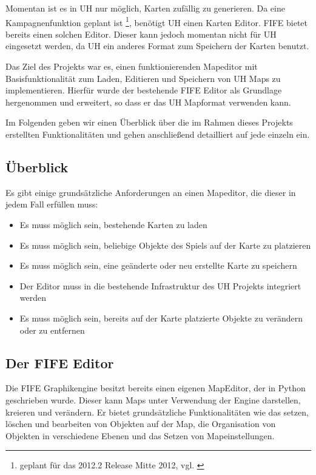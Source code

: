 Momentan ist es in UH nur möglich, Karten zufällig zu generieren. Da eine
Kampagnenfunktion geplant ist \footnote{geplant für das 2012.2 Release Mitte 2012, vgl.
\cite{roadmap}}, benötigt UH einen Karten Editor. FIFE bietet bereits einen solchen Editor.
Dieser kann jedoch momentan nicht für UH eingesetzt werden, da UH ein anderes Format
zum Speichern der Karten benutzt.

Das Ziel des Projekts war es, einen funktionierenden Mapeditor mit Basisfunktionalität
zum Laden, Editieren und Speichern von UH Maps zu implementieren. Hierfür wurde
der bestehende FIFE Editor als Grundlage hergenommen und erweitert, so dass er das
UH Mapformat verwenden kann.

Im Folgenden geben wir einen Überblick über die im Rahmen dieses Projekts erstellten
Funktionalitäten und gehen anschließend detailliert auf jede einzeln ein.

\subsection{Überblick}
Es gibt einige grundsätzliche Anforderungen an einen Mapeditor, die dieser in jedem
Fall erfüllen muss:

\begin{itemize}
\item Es muss möglich sein, bestehende Karten zu laden
\item Es muss möglich sein, beliebige Objekte des Spiels auf der Karte zu platzieren
\item Es muss möglich sein, eine geänderte oder neu erstellte Karte zu speichern
\item Der Editor muss in die bestehende Infrastruktur des UH Projekts integriert werden
\item Es muss möglich sein, bereits auf der Karte platzierte Objekte zu verändern oder
zu entfernen
\end{itemize}

\subsection{Der FIFE Editor}
Die FIFE Graphikengine besitzt bereits einen eigenen MapEditor, der in Python geschrieben
wurde. Dieser kann Maps unter
Verwendung der Engine darstellen, kreieren und verändern. Er bietet grundsätzliche
Funktionalitäten wie das setzen, löschen und bearbeiten von Objekten auf der Map,
die Organisation von Objekten in verschiedene Ebenen und das Setzen von Mapeinstellungen.

